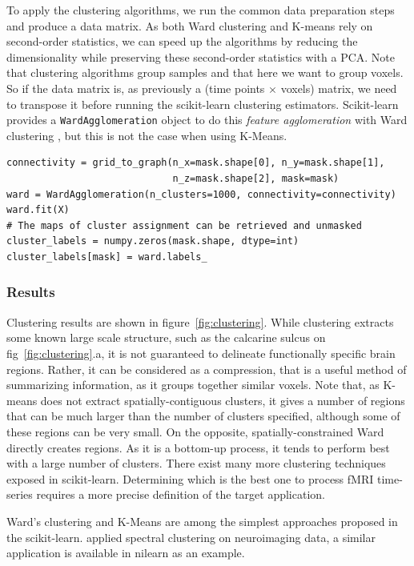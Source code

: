 \documentclass{frontiersSCNS} %
\begin{document}
To apply the clustering algorithms, we run the common data preparation
steps and produce a data matrix. As both Ward clustering and K-means rely
on second-order statistics, we can speed up the algorithms by reducing
the dimensionality while preserving these second-order statistics with a
PCA. Note that clustering algorithms group samples and that here we want
to group voxels. So if the data matrix is, as previously a (time points
$\times$ voxels) matrix, we need to transpose it before running the
scikit-learn clustering estimators. Scikit-learn provides a
\texttt{WardAgglomeration} object to do this \emph{feature agglomeration}
with Ward clustering \citep{michel2012supervisedclustering}, but this is
not the case when using K-Means.

\begin{lstlisting}
connectivity = grid_to_graph(n_x=mask.shape[0], n_y=mask.shape[1],
                             n_z=mask.shape[2], mask=mask)
ward = WardAgglomeration(n_clusters=1000, connectivity=connectivity)
ward.fit(X)
# The maps of cluster assignment can be retrieved and unmasked
cluster_labels = numpy.zeros(mask.shape, dtype=int)
cluster_labels[mask] = ward.labels_
\end{lstlisting}

\subsubsection{Results}

Clustering results are shown in figure~\ref{fig:clustering}. While
clustering extracts some known large scale structure, such as the
calcarine sulcus on fig~\ref{fig:clustering}.a, it is not guaranteed to
delineate functionally specific brain regions. Rather, it can be considered as a compression, that
is a useful method of summarizing information, as it groups together
similar voxels. Note that, as K-means does not extract spatially-contiguous
clusters, it gives a number of regions that can be much larger than the
number of clusters specified, although some of these regions can be very
small. On the opposite, spatially-constrained Ward directly creates regions.
As it is a bottom-up process, it tends to perform best
with a large number of clusters. There exist many more clustering
techniques exposed in scikit-learn. Determining which is the best one to
process fMRI time-series requires a more precise definition of the target
application.

Ward's clustering and K-Means are among the simplest approaches proposed in the
scikit-learn. \cite{craddock2011} applied spectral clustering on neuroimaging
data, a similar application is available in nilearn as an example.
\end{document}

